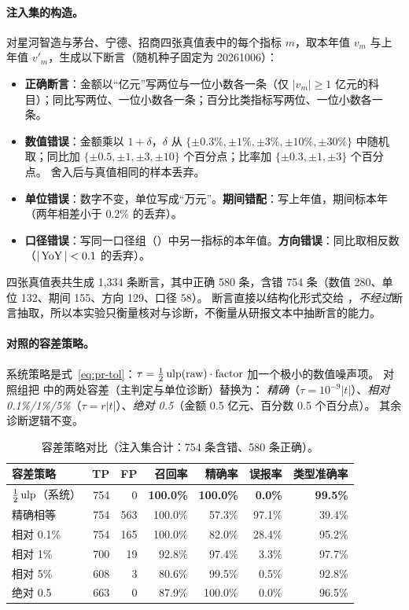 \paragraph{注入集的构造。}对星河智造与茅台、宁德、招商四张真值表中的每个指标 $m$，取本年值 $v_m$ 与上年值 $v'_m$，生成以下断言（随机种子固定为 20261006）：
\begin{itemize}
  \item \textbf{正确断言}：金额以“亿元”写两位与一位小数各一条（仅 $|v_m|\ge 1$ 亿元的科目）；同比写两位、一位小数各一条；百分比类指标写两位、一位小数各一条。
  \item \textbf{数值错误}：金额乘以 $1+\delta$，$\delta$ 从 $\{\pm0.3\%,\pm1\%,\pm3\%,\pm10\%,\pm30\%\}$ 中随机取；同比加 $\{\pm0.5,\pm1,\pm3,\pm10\}$ 个百分点；比率加 $\{\pm0.3,\pm1,\pm3\}$ 个百分点。
        舍入后与真值相同的样本丢弃。
  \item \textbf{单位错误}：数字不变，单位写成“万元”。\quad\textbf{期间错配}：写上年值，期间标本年（两年相差小于 0.2\% 的丢弃）。
  \item \textbf{口径错误}：写同一口径组（）中另一指标的本年值。\quad\textbf{方向错误}：同比取相反数（$|\operatorname{YoY}|<0.1$ 的丢弃）。
\end{itemize}
四张真值表共生成 1,334 条断言，其中正确 580 条，含错 754 条（数值 280、单位 132、期间 155、方向 129、口径 58）。
断言直接以结构化形式交给 ，\emph{不经过}断言抽取，所以本实验只衡量核对与诊断，不衡量从研报文本中抽断言的能力。

\paragraph{对照的容差策略。}系统策略是式~\eqref{eq:pr-tol}：$\tau=\tfrac12\operatorname{ulp}(\text{raw})\cdot\text{factor}$ 加一个极小的数值噪声项。
对照组把  中的两处容差（主判定与单位诊断）替换为：
\emph{精确}（$\tau=10^{-9}|t|$）、\emph{相对 0.1\%/1\%/5\%}（$\tau=r|t|$）、\emph{绝对 0.5}（金额 0.5 亿元、百分数 0.5 个百分点）。
其余诊断逻辑不变。

\begin{table}[t]
\centering
\caption{容差策略对比（注入集合计：754 条含错、580 条正确）。}
\label{tab:exp-tol}
\small
\begin{tabular}{@{}lrrrrrr@{}}
\toprule
容差策略 & TP & FP & 召回率 & 精确率 & 误报率 & 类型准确率 \\
\midrule
$\tfrac12\operatorname{ulp}$（系统） & 754 & 0 & \textbf{100.0\%} & \textbf{100.0\%} & \textbf{0.0\%} & \textbf{99.5\%} \\
精确相等 & 754 & 563 & 100.0\% & 57.3\% & 97.1\% & 39.4\% \\
相对 0.1\% & 754 & 165 & 100.0\% & 82.0\% & 28.4\% & 95.2\% \\
相对 1\% & 700 & 19 & 92.8\% & 97.4\% & 3.3\% & 97.7\% \\
相对 5\% & 608 & 3 & 80.6\% & 99.5\% & 0.5\% & 92.8\% \\
绝对 0.5 & 663 & 0 & 87.9\% & 100.0\% & 0.0\% & 96.5\% \\
\bottomrule
\end{tabular}
\end{table}

